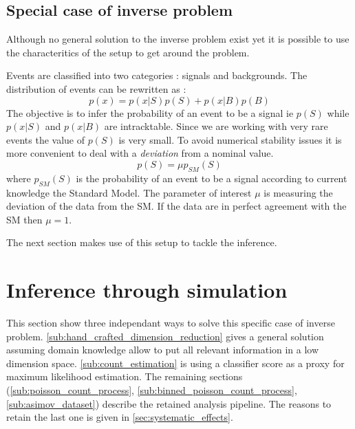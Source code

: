 \subsection{Special case of inverse problem} %
\label{sub:special_case_of_inverse_problem}

Although no general solution to the inverse problem exist yet it is possible to use the characteritics of the setup to get around the problem.

Events are classified into two categories : signals and backgrounds.
The distribution of events can be rewritten as :
\begin{equation}
 	p(x) = p(x|S) p(S) + p(x|B) p(B)
\end{equation}
The objective is to infer the probability of an event to be a signal ie $p(S)$ while $p(x|S)$ and $p(x|B)$ are intracktable.
Since we are working with very rare events the value of $p(S)$ is very small.
To avoid numerical stability issues it is more convenient to deal with a \emph{deviation} from a nominal value.
\begin{equation}
\label{eq:mu_definition}
	p(S) = \mu p_{SM}(S)
\end{equation}
where $p_{SM}(S)$ is the probability of an event to be a signal according to current knowledge \ie the Standard Model.
The parameter of interest $\mu$ is measuring the deviation of the data from the SM.
If the data are in perfect agreement with the SM then $\mu=1$.

The next section makes use of this setup to tackle the inference.






\section{Inference through simulation} %
\label{sec:inference_through_simulation}






This section show three independant ways to solve this specific case of inverse problem.
\autoref{sub:hand_crafted_dimension_reduction} gives a general solution assuming domain knowledge allow to put all relevant information in a low dimension space.
\autoref{sub:count_estimation} is using a classifier score as a proxy for maximum likelihood estimation.
The remaining sections (\autoref{sub:poisson_count_process}, \autoref{sub:binned_poisson_count_process}, \autoref{sub:asimov_dataset}) describe the retained analysis pipeline.
The reasons to retain the last one is given in \autoref{sec:systematic_effects}.









